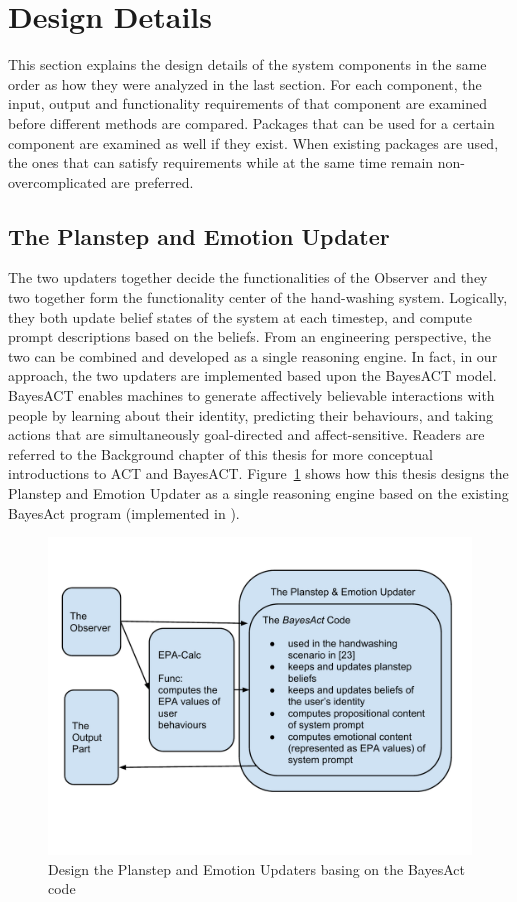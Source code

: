 \section{Design Details}
\label{sec:design-details}

This section explains the design details of the system components in the same order as how they were analyzed in the last section. For each component, the input, output and functionality requirements of that component are examined before different methods are compared. Packages that can be used for a certain component are examined as well if they exist. When existing packages are used, the ones that can satisfy requirements while at the same time remain non-overcomplicated are preferred.

\subsection{The Planstep and Emotion Updater}

The two updaters together decide the functionalities of the Observer and they two together form the functionality center of the hand-washing system. Logically, they both update belief states of the system at each timestep, and compute prompt descriptions based on the beliefs. From an engineering perspective, the two can be combined and developed as a single reasoning engine. In fact, in our approach, the two updaters are implemented based upon the BayesACT model. BayesACT enables machines to generate affectively believable interactions with people by learning about their identity, predicting their behaviours, and taking actions that are simultaneously goal-directed and affect-sensitive. Readers are referred to the Background chapter of this thesis for more conceptual introductions to ACT and BayesACT. Figure~\ref{fig:updater} shows how this thesis designs the Planstep and Emotion Updater as a single reasoning engine based on the existing BayesAct program (implemented in \cite{hoey2013bayesian}).

\begin{figure}[p]
\centering
\includegraphics[width=\linewidth]{fig-updater.pdf}
\caption{Design the Planstep and Emotion Updaters basing on the BayesAct code}
\label{fig:updater}
\end{figure}

